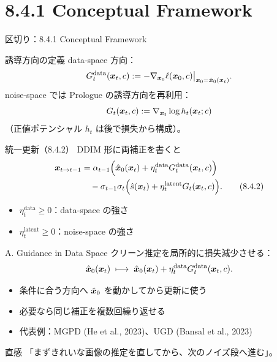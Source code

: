\section{8.4.1 Conceptual Framework}
\asmain
\begin{frame}{区切り：8.4.1 Conceptual Framework}
    \tableofcontents[currentsection]
\end{frame}
\asmain
\begin{frame}{誘導方向の定義}
    data-space 方向：
    \[
        G_t^{\mathrm{data}}(\bm{x}_t,c)
        :=
        -\nabla_{\bm{x}_0}\ell(\bm{x}_0,c)\big|_{\bm{x}_0=\hat{\bm{x}}_0(\bm{x}_t)}.
    \]
    noise-space では Prologue の誘導方向を再利用：
    \[
        G_t(\bm{x}_t,c)
        :=
        \nabla_{\bm{x}_t}\log h_t(\bm{x}_t;c)
    \]
    （正値ポテンシャル $h_t$ は後で損失から構成）。
\end{frame}
\asmain
\begin{frame}{統一更新（8.4.2）}
    DDIM 形に両補正を書くと
    \begin{align*}
        \bm{x}_{t\to t-1}
        &=
        \alpha_{t-1}\Bigl(
            \hat{\bm{x}}_0(\bm{x}_t)+\eta_t^{\mathrm{data}}G_t^{\mathrm{data}}(\bm{x}_t,c)
        \Bigr) \\
        &\quad
        -\sigma_{t-1}\sigma_t\Bigl(
            \hat{s}(\bm{x}_t)+\eta_t^{\mathrm{latent}}G_t(\bm{x}_t,c)
        \Bigr).
        \tag{8.4.2}
    \end{align*}
    \begin{itemize}
        \item $\eta_t^{\mathrm{data}}\ge 0$：data-space の強さ
        \item $\eta_t^{\mathrm{latent}}\ge 0$：noise-space の強さ
    \end{itemize}
\end{frame}
\asmain
\begin{frame}{A. Guidance in Data Space}
    クリーン推定を局所的に損失減少させる：
    \[
        \hat{\bm{x}}_0(\bm{x}_t)
        \;\longmapsto\;
        \hat{\bm{x}}_0(\bm{x}_t)+\eta_t^{\mathrm{data}}G_t^{\mathrm{data}}(\bm{x}_t,c).
    \]
    \begin{itemize}
        \item 条件に合う方向へ $\hat{\bm{x}}_0$ を動かしてから更新に使う
        \item 必要なら同じ補正を複数回繰り返せる
        \item 代表例：MGPD (He et al., 2023)、UGD (Bansal et al., 2023)
    \end{itemize}
    \begin{exampleblock}{直感}
        「まずきれいな画像の推定を直してから、次のノイズ段へ進む」。
    \end{exampleblock}
\end{frame}
